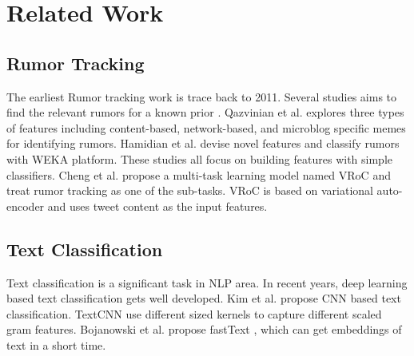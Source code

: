 \section{Related Work}
\label{sec:related}

\subsection{Rumor Tracking}
\label{sec:rumortracking}
The earliest Rumor tracking work is trace back to 2011. Several studies aims to find the relevant rumors for a known prior \cite{DBLP:journals/csur/ZubiagaABLP18}. Qazvinian et al. \cite{DBLP:conf/emnlp/QazvinianRRM11} explores three types of features including content-based, network-based, and microblog specific memes for identifying rumors. Hamidian et al. \cite{DBLP:journals/corr/abs-1912-08926} devise novel features and classify rumors with WEKA platform. These studies all focus on building features with simple classifiers. Cheng et al. \cite{DBLP:conf/www/ChengNB20} propose a multi-task learning model named VRoC and treat rumor tracking as one of the sub-tasks. VRoC is based on variational auto-encoder and uses tweet content as the input features.

\subsection{Text Classification}
\label{sec:textclassification}
Text classification is a significant task in NLP area. In recent years, deep learning based text classification gets well developed. Kim et al. \cite{DBLP:conf/emnlp/Kim14} propose CNN based text classification. TextCNN use different sized kernels to capture different scaled gram features. Bojanowski et al. propose fastText  \cite{DBLP:journals/tacl/BojanowskiGJM17}, which can get embeddings of text in a short time.

